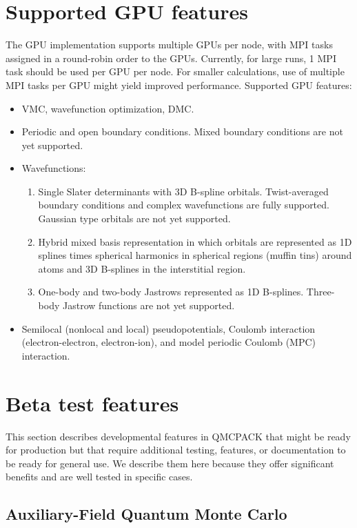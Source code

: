 \section{Supported GPU features}

The GPU implementation supports multiple GPUs per node, with MPI tasks assigned
in a round-robin order to the GPUs. Currently, for large runs, 1 MPI task should
be used per GPU per node. For smaller calculations, use of multiple
MPI tasks per GPU might yield improved performance. Supported GPU features:

\begin{itemize}
  \item VMC, wavefunction optimization, DMC.
  \item Periodic and open boundary conditions. Mixed boundary conditions are not yet supported.
  \item Wavefunctions:
    \begin{enumerate}
        \item Single Slater determinants with 3D B-spline orbitals. Twist-averaged boundary conditions and complex wavefunctions are fully supported. Gaussian type orbitals are not yet supported.
        \item Hybrid mixed basis representation in which orbitals are represented as 1D splines times spherical harmonics in spherical regions (muffin tins) around atoms and 3D B-splines in the interstitial region.
        \item One-body and two-body Jastrows represented as 1D
          B-splines. Three-body Jastrow functions are
          not yet supported.
    \end{enumerate}
  \item Semilocal (nonlocal and local) pseudopotentials, Coulomb interaction (electron-electron, electron-ion), and model periodic Coulomb (MPC) interaction.
\end{itemize}

\section{Beta test features}

This section describes developmental features in QMCPACK that might be
ready for production but that require additional testing, features, or
documentation to be ready for general use. We describe them here
because they offer significant benefits and are well tested in
specific cases.

\subsection{Auxiliary-Field Quantum Monte Carlo}

